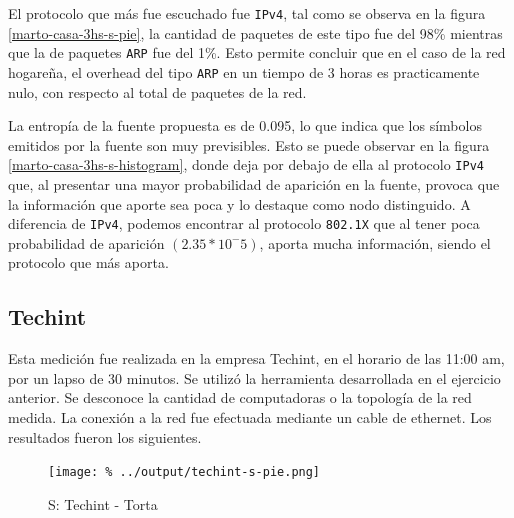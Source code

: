 \documentclass[final,inline,a4paper,narroweqnarray]{ieee}
\begin{document}
    El protocolo que más fue escuchado fue \texttt{IPv4}, tal como se
    observa en la figura \ref{marto-casa-3hs-s-pie}, la cantidad de
    paquetes  de este tipo fue del 98\% mientras que la de paquetes
    \texttt{ARP} fue del 1\%. Esto permite concluir que en el caso de
    la red hogareña, el overhead del tipo \texttt{ARP} en un tiempo
    de 3 horas es practicamente nulo, con respecto al total de
    paquetes de la red.

    La entropía de la fuente propuesta es de 0.095, lo que indica que los
    símbolos emitidos por la fuente son muy previsibles. Esto se puede
    observar en la figura \ref{marto-casa-3hs-s-histogram}, donde deja
    por debajo de ella al protocolo \texttt{IPv4} que, al presentar una
    mayor probabilidad de aparición en la fuente, provoca que la información que aporte sea
    poca y lo destaque como nodo distinguido. A diferencia de
    \texttt{IPv4}, podemos encontrar al protocolo \texttt{802.1X} que al
    tener poca probabilidad de aparición $(2.35 * 10^-5)$, aporta mucha
    información, siendo el protocolo que más aporta.
      
    
    \subsection{Techint}

    Esta medición fue realizada en la empresa Techint, en el horario de
    las 11:00 am, por un lapso de 30 minutos. Se utilizó la herramienta
    desarrollada en el ejercicio anterior. Se desconoce la cantidad de
    computadoras o la topología de la red medida. La conexión a la red fue
    efectuada mediante un cable de ethernet. Los resultados fueron
    los siguientes.
    
    
    \begin{figure}[ht]\begin{center}
      \texttt{[image: \%
      ../output/techint-s-pie.png]}
      \vspace{-3em}
      \caption{S: Techint - Torta}
      \label{techint-s-pie}
    \end{center}\end{figure}
 
\end{document}
